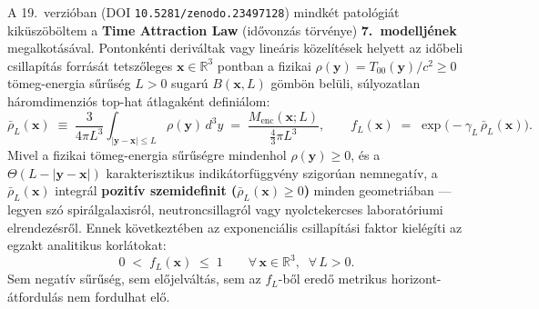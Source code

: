 \documentclass[10pt,a4paper]{article}
\begin{document}
\par
A 19.\ verzi\'oban (DOI \texttt{10.5281/zenodo.23497128}) mindk\'et patol\'ogi\'at kik\"usz\"ob\"oltem a \textbf{Time Attraction Law} (id\H{o}vonz\'as t\"orv\'enye) \textbf{7.\ modellj\'enek} megalkot\'as\'aval. Pontonk\'enti deriv\'altak vagy line\'aris k\"ozel\'it\'esek helyett az id\H{o}beli csillap\'it\'as forr\'as\'at tetsz\H{o}leges $\mathbf{x} \in \mathbb{R}^3$ pontban a fizikai $\rho(\mathbf{y}) = T_{00}(\mathbf{y})/c^2 \ge 0$ t\"omeg-energia s\H{u}r\H{u}s\'eg $L > 0$ sugar\'u $B(\mathbf{x},L)$ g\"omb\"on bel\"uli, s\'ulyozatlan h\'aromdimenzi\'os top-hat \'atlagak\'ent defini\'alom:
\begin{equation}
  \bar{\rho}_L(\mathbf{x}) \;\equiv\; \frac{3}{4\pi L^3}\int_{|\mathbf{y}-\mathbf{x}|\le L} \rho(\mathbf{y})\,d^3y \;=\; \frac{M_{\text{enc}}(\mathbf{x};L)}{\frac{4}{3}\pi L^3}, \qquad
  f_L(\mathbf{x}) \;=\; \exp\!\bigl(-\gamma_L\,\bar{\rho}_L(\mathbf{x})\bigr).
\end{equation}
Mivel a fizikai t\"omeg-energia s\H{u}r\H{u}s\'egre mindenhol $\rho(\mathbf{y}) \ge 0$, \'es a $\Theta(L - |\mathbf{y}-\mathbf{x}|)$ karakterisztikus indik\'atorf\"uggv\'eny szigor\'uan nemnegat\'iv, a $\bar{\rho}_L(\mathbf{x})$ integr\'al \textbf{pozit\'iv szemidefinit ($\bar{\rho}_L(\mathbf{x}) \ge 0$)} minden geometri\'aban --- legyen sz\'o spir\'algalaxisr\'ol, neutroncsillagr\'ol vagy nyolctekercses laborat\'oriumi elrendez\'esr\H{o}l. Ennek k\"ovetkezt\'eben az exponenci\'alis csillap\'it\'asi faktor kiel\'eg\'iti az egzakt analitikus korl\'atokat:
\begin{equation}
  0 \;<\; f_L(\mathbf{x}) \;\le\; 1 \qquad \forall\,\mathbf{x}\in\mathbb{R}^3,\;\;\forall\,L > 0.
\end{equation}
Sem negat\'iv s\H{u}r\H{u}s\'eg, sem el\H{o}jelv\'alt\'as, sem az $f_L$-b\H{o}l ered\H{o} metrikus horizont-\'atfordul\'as nem fordulhat el\H{o}.
\end{document}
